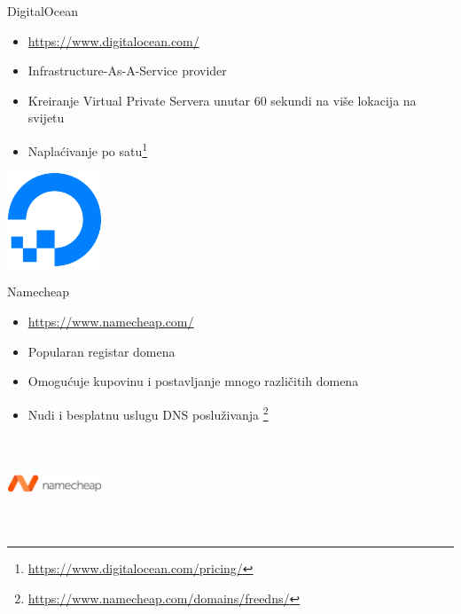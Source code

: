 \documentclass[t]{beamer}
\begin{document}
\begin{frame}{DigitalOcean}
    \begin{itemize}
        \item \url{https://www.digitalocean.com/}
        \item Infrastructure-As-A-Service provider
        \item Kreiranje Virtual Private Servera unutar 60 sekundi na više lokacija na svijetu
        \item Naplaćivanje po satu\footnote{\url{https://www.digitalocean.com/pricing/}}
    \end{itemize}
    \includegraphics[width=\textwidth,height=80pt,keepaspectratio,right]{digital_ocean_768.png}
\end{frame}

\begin{frame}{Namecheap}
    \begin{itemize}
        \item \url{https://www.namecheap.com/}
        \item Popularan registar domena
        \item Omogućuje kupovinu i postavljanje mnogo različitih domena
        \item Nudi i besplatnu uslugu DNS posluživanja \footnote{\url{https://www.namecheap.com/domains/freedns/}}
    \end{itemize}
    \vspace*{\fill}
    \includegraphics[width=80pt,height=80pt,keepaspectratio,right]{namecheap.png}
    \vspace{\fill}
\end{frame}
\end{document}
